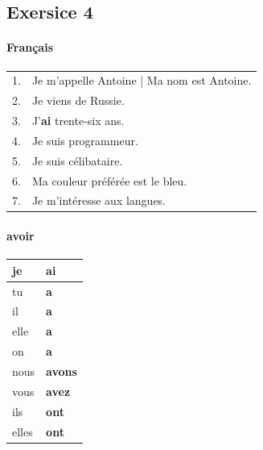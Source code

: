 \documentclass[9pt, oneside]{article}
\begin{document}
\subsection{Exersice 4}
\paragraph{Français}
\begin{tabular}{l l}
1. & Je m'appelle Antoine | Ma nom est Antoine.\\
2. & Je viens de Russie.\\
3. & J'{\bfseries ai} trente-six ans.\\
4. & Je suis programmeur.\\
5. & Je suis célibataire.\\
6. & Ma couleur préférée est le bleu.\\
7. & Je m'intéresse aux langues.\\
\end{tabular}

\paragraph*{avoir}
\begin{tabular}{l|l}
	je & {\bfseries ai}\\
	\hline
	tu & {\bfseries a}\\
	\hline
	il & {\bfseries a}\\
	\hline
	elle & {\bfseries a}\\
	\hline
	on & {\bfseries a}\\
	\hline
	nous & {\bfseries avons}\\
	\hline
	vous & {\bfseries avez}\\
	\hline
	ils & {\bfseries ont}\\
	\hline
	elles & {\bfseries ont}\\
\end{tabular}
\end{document}
